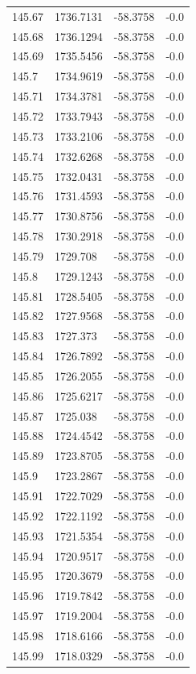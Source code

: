 \begin{table}[H]
\begin{tabular}{llll}
145.67 & 1736.7131 & -58.3758 & -0.0 \\
145.68 & 1736.1294 & -58.3758 & -0.0 \\
145.69 & 1735.5456 & -58.3758 & -0.0 \\
145.7 & 1734.9619 & -58.3758 & -0.0 \\
145.71 & 1734.3781 & -58.3758 & -0.0 \\
145.72 & 1733.7943 & -58.3758 & -0.0 \\
145.73 & 1733.2106 & -58.3758 & -0.0 \\
145.74 & 1732.6268 & -58.3758 & -0.0 \\
145.75 & 1732.0431 & -58.3758 & -0.0 \\
145.76 & 1731.4593 & -58.3758 & -0.0 \\
145.77 & 1730.8756 & -58.3758 & -0.0 \\
145.78 & 1730.2918 & -58.3758 & -0.0 \\
145.79 & 1729.708 & -58.3758 & -0.0 \\
145.8 & 1729.1243 & -58.3758 & -0.0 \\
145.81 & 1728.5405 & -58.3758 & -0.0 \\
145.82 & 1727.9568 & -58.3758 & -0.0 \\
145.83 & 1727.373 & -58.3758 & -0.0 \\
145.84 & 1726.7892 & -58.3758 & -0.0 \\
145.85 & 1726.2055 & -58.3758 & -0.0 \\
145.86 & 1725.6217 & -58.3758 & -0.0 \\
145.87 & 1725.038 & -58.3758 & -0.0 \\
145.88 & 1724.4542 & -58.3758 & -0.0 \\
145.89 & 1723.8705 & -58.3758 & -0.0 \\
145.9 & 1723.2867 & -58.3758 & -0.0 \\
145.91 & 1722.7029 & -58.3758 & -0.0 \\
145.92 & 1722.1192 & -58.3758 & -0.0 \\
145.93 & 1721.5354 & -58.3758 & -0.0 \\
145.94 & 1720.9517 & -58.3758 & -0.0 \\
145.95 & 1720.3679 & -58.3758 & -0.0 \\
145.96 & 1719.7842 & -58.3758 & -0.0 \\
145.97 & 1719.2004 & -58.3758 & -0.0 \\
145.98 & 1718.6166 & -58.3758 & -0.0 \\
145.99 & 1718.0329 & -58.3758 & -0.0 \\

\end{tabular}
\end{table}
